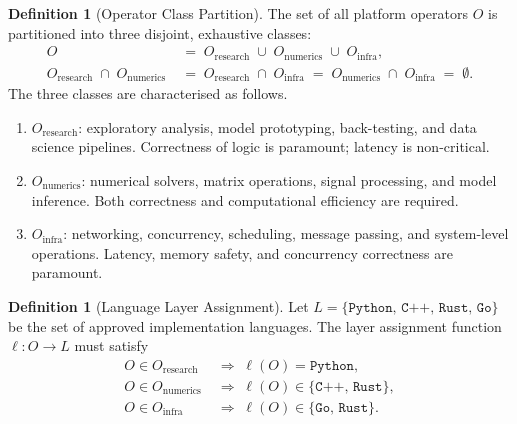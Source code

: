 \documentclass[12pt,openany]{book}
\numberwithin{equation}{chapter}
\theoremstyle{plain}
\theoremstyle{definition}
\newtheorem{definition}[theorem]{Definition}
\theoremstyle{remark}
\numberwithin{equation}{chapter}
\theoremstyle{plain}
\newcommand{\calO}{\mathcal{O}}
\newcommand{\calL}{\mathcal{L}}
\def\calL{L}%
\def\calO{O}%
\begin{document}
\begin{definition}[Operator Class Partition]
\label{def:op-partition}
The set of all platform operators $\calO$ is partitioned into three
disjoint, exhaustive classes:
\begin{align}
  \calO
  &\;=\;
  \calO_{\text{research}}
  \;\cup\;
  \calO_{\text{numerics}}
  \;\cup\;
  \calO_{\text{infra}},
  \label{eq:op-partition} \\[4pt]
  \calO_{\text{research}}
  \;\cap\;
  \calO_{\text{numerics}}
  &\;=\;
  \calO_{\text{research}}
  \;\cap\;
  \calO_{\text{infra}}
  \;=\;
  \calO_{\text{numerics}}
  \;\cap\;
  \calO_{\text{infra}}
  \;=\;
  \emptyset.
  \label{eq:op-disjoint}
\end{align}
The three classes are characterised as follows.
\begin{enumerate}
  \item $\calO_{\text{research}}$: exploratory analysis, model
        prototyping, back-testing, and data science pipelines.
        Correctness of logic is paramount; latency is non-critical.
  \item $\calO_{\text{numerics}}$: numerical solvers, matrix
        operations, signal processing, and model inference.
        Both correctness and computational efficiency are required.
  \item $\calO_{\text{infra}}$: networking, concurrency, scheduling,
        message passing, and system-level operations.
        Latency, memory safety, and concurrency correctness are
        paramount.
\end{enumerate}
\end{definition}

\begin{definition}[Language Layer Assignment]
\label{def:lang-assignment}
Let $\calL = \{\texttt{Python},\,\texttt{C++},\,\texttt{Rust},\,
\texttt{Go}\}$ be the set of approved implementation languages.
The layer assignment function $\ell : \calO \to \calL$ must satisfy
\begin{align}
  O \in \calO_{\text{research}}
    &\;\Longrightarrow\;
    \ell(O) = \texttt{Python},
    \label{eq:lang-py} \\[2pt]
  O \in \calO_{\text{numerics}}
    &\;\Longrightarrow\;
    \ell(O) \in \{\texttt{C++},\,\texttt{Rust}\},
    \label{eq:lang-num} \\[2pt]
  O \in \calO_{\text{infra}}
    &\;\Longrightarrow\;
    \ell(O) \in \{\texttt{Go},\,\texttt{Rust}\}.
    \label{eq:lang-infra}
\end{align}
\end{definition}
\end{document}
